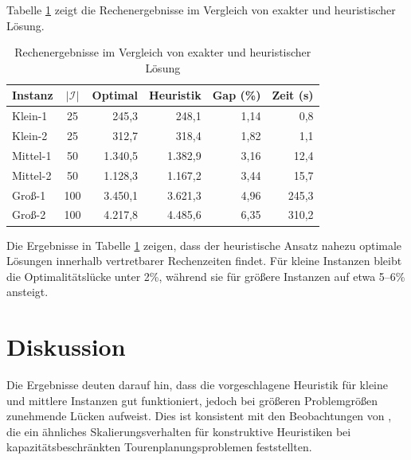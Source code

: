 \documentclass[11pt,a4paper]{article}
\begin{document}
Tabelle \ref{tab:ergebnisse} zeigt die Rechenergebnisse im Vergleich von exakter und heuristischer Lösung.
\begin{table}[H]
	\centering
	\caption{Rechenergebnisse im Vergleich von exakter und heuristischer Lösung}
	\label{tab:ergebnisse}
	\begin{tabular}{lcrrrr}
		\toprule
		Instanz & $|\mathcal{I}|$ & Optimal & Heuristik & Gap (\%) & Zeit (s)\\
		\midrule
		Klein-1  & 25  &   245,3 &   248,1 & 1,14 &    0,8\\
		Klein-2  & 25  &   312,7 &   318,4 & 1,82 &    1,1\\
		Mittel-1 & 50  & 1.340,5 & 1.382,9 & 3,16 &   12,4\\
		Mittel-2 & 50  & 1.128,3 & 1.167,2 & 3,44 &   15,7\\
		Groß-1   & 100 & 3.450,1 & 3.621,3 & 4,96 &  245,3\\
		Groß-2   & 100 & 4.217,8 & 4.485,6 & 6,35 &  310,2\\
		\bottomrule
	\end{tabular}
\end{table}

Die Ergebnisse in Tabelle \ref{tab:ergebnisse} zeigen, dass der heuristische Ansatz nahezu optimale Lösungen innerhalb vertretbarer Rechenzeiten findet. Für kleine Instanzen bleibt die Optimalitätslücke unter 2\%, während sie für größere Instanzen auf etwa 5--6\% ansteigt.

\section{Diskussion}
\label{sec:diskussion}
Die Ergebnisse deuten darauf hin, dass die vorgeschlagene Heuristik für kleine und mittlere Instanzen gut funktioniert, jedoch bei größeren Problemgrößen zunehmende Lücken aufweist. Dies ist konsistent mit den Beobachtungen von \textcite{toth2014vehicle}, die ein ähnliches Skalierungsverhalten für konstruktive Heuristiken bei kapazitätsbeschränkten Tourenplanungsproblemen feststellten.
\end{document}
